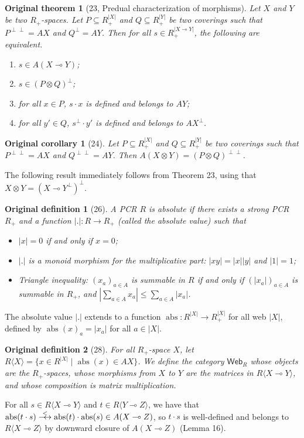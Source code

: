 \documentclass[10pt,a4paper]{article}
\newcommand{\lolli}{\multimap}
\newcommand{\Web}{\mathsf{Web}}
\newcommand{\abs}{\operatorname{abs}}
\newcommand{\dequiv}{\mathrel{\relbar\joinrel\leftrightarrow}}
\newcommand{\Rmod}[1]{R\langle #1\rangle}
\newtheorem*{originaldef}{Original definition}
\newtheorem*{originalthm}{Original theorem}
\newtheorem*{originalcor}{Original corollary}
\newcommand{\dlequiv}{\mathrel{\stackrel{<}{\dequiv}}}
\begin{document}
\begin{originalthm}[23, Predual characterization of morphisms]
Let $X$ and $Y$ be two $R_+$-spaces. Let $P\subseteq R_+^{|X|}$ and $Q\subseteq R_+^{|Y|}$ be two coverings such that $P^{\perp\perp}=AX$ and $Q^\perp=AY$. Then for all $s\in R_+^{|X\lolli Y|}$, the following are equivalent.
\begin{enumerate}\item $s\in A(X\lolli Y)$;\item $s\in(P\otimes Q)^\perp$;\item for all $x\in P$, $s\cdot x$ is defined and belongs to $AY$;\item for all $y'\in Q$, $s^\perp\cdot y'$ is defined and belongs to $AX^\perp$.\end{enumerate}
\end{originalthm}
\begin{originalcor}[24] Let $P\subseteq R_+^{|X|}$ and $Q\subseteq R_+^{|Y|}$ be two coverings such that $P^{\perp\perp}=AX$ and $Q^{\perp\perp}=AY$. Then $A(X\otimes Y)=(P\otimes Q)^{\perp\perp}$.\end{originalcor}
The following result immediately follows from Theorem 23, using that $X\otimes Y=(X\lolli Y^\perp)^\perp$.
\begin{originaldef}[26] A PCR $R$ is absolute if there exists a strong PCR $R_+$ and a function $|.|:R\to R_+$ (called the absolute value) such that
\begin{itemize}\item $|x|=0$ if and only if $x=0$;\item $|.|$ is a monoid morphism for the multiplicative part: $|xy|=|x||y|$ and $|1|=1$;\item Triangle inequality: $(x_a)_{a\in A}$ is summable in $R$ if and only if $(|x_a|)_{a\in A}$ is summable in $R_+$, and $|\sum_{a\in A}x_a|\leq\sum_{a\in A}|x_a|$.\end{itemize}
\end{originaldef}
The absolute value $|.|$ extends to a function $\abs:R^{|X|}\to R_+^{|X|}$ for all web $|X|$, defined by $\abs(x)_a=|x_a|$ for all $a\in|X|$.
\begin{originaldef}[28] For all $R_+$-space $X$, let $\Rmod{X}=\{x\in R^{|X|}\mid\abs(x)\in AX\}$. We define the category $\Web_R$ whose objects are the $R_+$-spaces, whose morphisms from $X$ to $Y$ are the matrices in $\Rmod{X\lolli Y}$, and whose composition is matrix multiplication.\end{originaldef}
For all $s\in\Rmod{X\lolli Y}$ and $t\in\Rmod{Y\lolli Z}$, we have that $\abs(t\cdot s)\dlequiv\abs(t)\cdot\abs(s)\in A(X\lolli Z)$, so $t\cdot s$ is well-defined and belongs to $\Rmod{X\lolli Z}$ by downward closure of $A(X\lolli Z)$ (Lemma 16).
\end{document}
